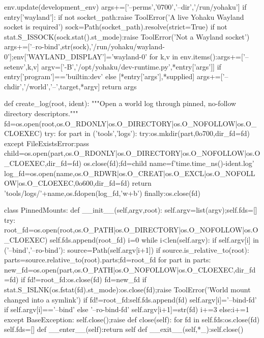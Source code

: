     env.update(development_env)
    args+=['--perms','0700','--dir','/run/yohaku']
    if entry['wayland']:
        if not socket_path:raise ToolError('A live Yohaku Wayland socket is required')
        sock=Path(socket_path).resolve(strict=True)
        if not stat.S_ISSOCK(sock.stat().st_mode):raise ToolError('Not a Wayland socket')
        args+=['--ro-bind',str(sock),'/run/yohaku/wayland-0'];env['WAYLAND_DISPLAY']='wayland-0'
    for k,v in env.items():args+=['--setenv',k,v]
    argv=['-B','/opt/yohaku/dev-runtime.py',*entry['args']] if entry['program']=='builtin:dev' else [*entry['args'],*supplied]
    args+=['--chdir','/world','--',target,*argv]
    return args

def create_log(root, ident):
    """Open a world log through pinned, no-follow directory descriptors."""
    fd=os.open(root,os.O_RDONLY|os.O_DIRECTORY|os.O_NOFOLLOW|os.O_CLOEXEC)
    try:
        for part in ('tools','logs'):
            try:os.mkdir(part,0o700,dir_fd=fd)
            except FileExistsError:pass
            child=os.open(part,os.O_RDONLY|os.O_DIRECTORY|os.O_NOFOLLOW|os.O_CLOEXEC,dir_fd=fd)
            os.close(fd);fd=child
        name=f'{time.time_ns()}-{ident}.log'
        log_fd=os.open(name,os.O_RDWR|os.O_CREAT|os.O_EXCL|os.O_NOFOLLOW|os.O_CLOEXEC,0o600,dir_fd=fd)
        return 'tools/logs/'+name,os.fdopen(log_fd,'w+b')
    finally:os.close(fd)

class PinnedMounts:
    def __init__(self,argv,root):
        self.argv=list(argv);self.fds=[]
        try:
            root_fd=os.open(root,os.O_PATH|os.O_DIRECTORY|os.O_NOFOLLOW|os.O_CLOEXEC)
            self.fds.append(root_fd)
            i=0
            while i<len(self.argv):
                if self.argv[i] in ('--bind','--ro-bind'):
                    source=Path(self.argv[i+1])
                    if source.is_relative_to(root):
                        parts=source.relative_to(root).parts;fd=root_fd
                        for part in parts:
                            new_fd=os.open(part,os.O_PATH|os.O_NOFOLLOW|os.O_CLOEXEC,dir_fd=fd)
                            if fd!=root_fd:os.close(fd)
                            fd=new_fd
                            if stat.S_ISLNK(os.fstat(fd).st_mode):os.close(fd);raise ToolError('World mount changed into a symlink')
                        if fd!=root_fd:self.fds.append(fd)
                        self.argv[i]='--bind-fd' if self.argv[i]=='--bind' else '--ro-bind-fd'
                        self.argv[i+1]=str(fd)
                    i+=3
                else:i+=1
        except BaseException:
            self.close();raise
    def close(self):
        for fd in self.fds:os.close(fd)
        self.fds=[]
    def __enter__(self):return self
    def __exit__(self,*_):self.close()

